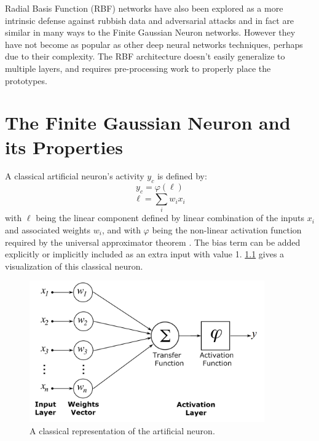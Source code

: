 \documentclass[12pt,oneside]{CUNY_PhD}
\begin{document}
Radial Basis Function (RBF) networks have also been explored as a more intrinsic defense against rubbish data and adversarial attacks\cite{chenou2019radial,zadeh2018deeprbf} and in fact are similar in many ways to the Finite Gaussian Neuron networks. However they have not become as popular as other deep neural networks techniques, perhaps due to their complexity. The RBF architecture doesn't easily generalize to multiple layers, and requires pre-processing work to properly place the prototypes.


\chapter{The Finite Gaussian Neuron and its Properties}
A classical artificial neuron's activity $y_c$ is defined by: 
\[ y_{c} = \varphi(\ell) \]
\[ \ell = \sum_{i}w_i x_i\]
with $\ell$ being the linear component defined by linear combination of the inputs $x_i$ and associated weights $w_i$, and with $\varphi$ being the non-linear activation function required by the universal approximator theorem \cite{cybenko1989approximation, hornik1989multilayer}. The bias term can be added explicitly or implicitly included as an extra input with value 1. \ref{fig:classic-neuron} gives a visualization of this classical neuron. 
\begin{figure}[!htbp]
    \centering
    \includegraphics[width=0.9\textwidth]{images/artificial_neuron_model.png}
    \caption{A classical representation of the artificial neuron.}
    \label{fig:classic-neuron}
\end{figure}\\
\end{document}
